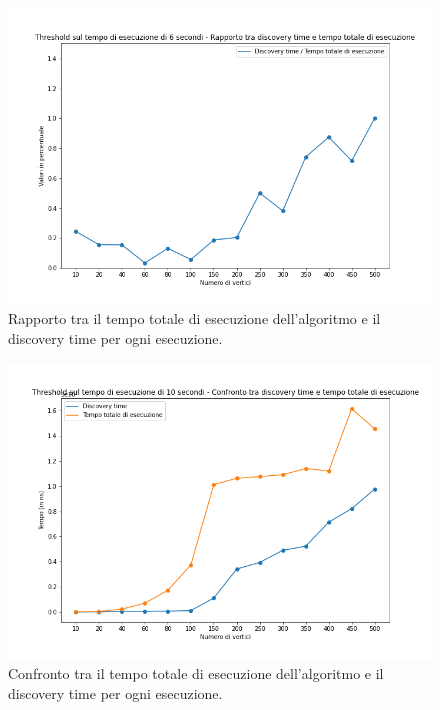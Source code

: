 \begin{figure}[H]
	\centering
	\includegraphics[width=1\textwidth]{res/images/single/karger-stein/discovery-time/threshold6/karger_stein_rapporto_discovery_time_total_time_threshold_6s.png}
	\caption{Rapporto tra il tempo totale di esecuzione dell'algoritmo 
	e il discovery time per ogni esecuzione.}
	\label{fig:karger_stein_rapporto_discovery_time_total_time_threshold_6s}
\end{figure}

\begin{figure}[H]
	\centering
	\includegraphics[width=1\textwidth]{res/images/single/karger-stein/discovery-time/threshold10/karger_stein_confronto_discovery_time_total_time_threshold_10s.png}
	\caption{Confronto tra il tempo totale di esecuzione dell'algoritmo e il discovery time per ogni esecuzione.}
	\label{fig:karger_stein_confronto_discovery_time_total_time_threshold_10s}
\end{figure}


